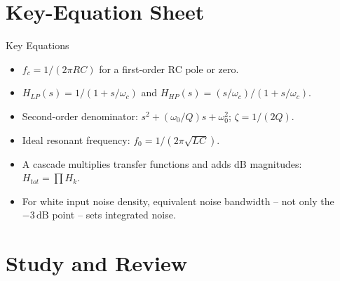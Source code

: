 \documentclass[10pt,letterpaper]{article}
\begin{document}
\section{Key-Equation Sheet}
\begin{CornellExamBox}{Key Equations}
\begin{itemize}
  \item $f_c=1/(2\pi RC)$ for a first-order RC pole or zero.
  \item $H_{LP}(s)=1/(1+s/\omega_c)$ and $H_{HP}(s)=(s/\omega_c)/(1+s/\omega_c)$.
  \item Second-order denominator: $s^2+(\omega_0/Q)s+\omega_0^2$; $\zeta=1/(2Q)$.
  \item Ideal resonant frequency: $f_0=1/(2\pi\sqrt{LC})$.
  \item A cascade multiplies transfer functions and adds dB magnitudes: $H_{tot}=\prod H_k$.
  \item For white input noise density, equivalent noise bandwidth -- not only the $-3\,\mathrm{dB}$ point -- sets integrated noise.
\end{itemize}\end{CornellExamBox}
\section{Study and Review}
\end{document}
